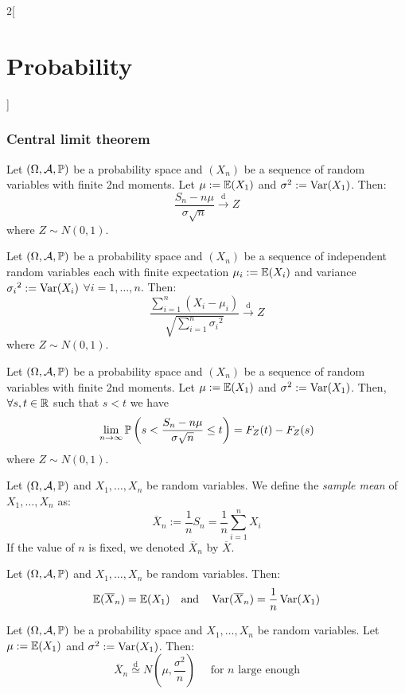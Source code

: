 \documentclass[../../../main.tex]{subfiles}
\begin{document}
\begin{multicols}{2}[\section{Probability}]
  \subsubsection{Central limit theorem}
  \begin{theorem}
    Let $(\Omega,\mathcal{A},\mathbb{P})$ be a probability space and $(X_n)$ be a sequence of \iid random variables with finite 2nd moments. Let $\mu:=\mathbb{E}(X_1)$ and $\sigma^2:=\operatorname{Var}(X_1)$. Then: $$\frac{S_n-n\mu}{\sigma\sqrt{n}}\overset{\text{d}}{\longrightarrow} Z$$
    where $Z\sim N(0,1)$.
  \end{theorem}
  \begin{theorem}
    Let $(\Omega,\mathcal{A},\mathbb{P})$ be a probability space and $(X_n)$ be a sequence of independent random variables each with finite expectation $\mu_i:=\mathbb{E}(X_i)$ and variance ${\sigma_i}^2:=\operatorname{Var}(X_i)$ $\forall i=1,\ldots,n$. Then: $$\frac{\sum_{i=1}^n(X_i-\mu_i)}{\sqrt{\sum_{i=1}^n{\sigma_i}^2}}\overset{\text{d}}{\longrightarrow} Z$$
    where $Z\sim N(0,1)$.
  \end{theorem}
  \begin{corollary}
    Let $(\Omega,\mathcal{A},\mathbb{P})$ be a probability space and $(X_n)$ be a sequence of \iid random variables with finite 2nd moments. Let $\mu:=\mathbb{E}(X_1)$ and $\sigma^2:=\operatorname{Var}(X_1)$. Then, $\forall s,t\in\mathbb{R}$ such that $s<t$ we have $$\lim_{n\to\infty}\mathbb{P}\left(s<\frac{S_n-n\mu}{\sigma\sqrt{n}}\leq t\right)=F_Z(t)-F_Z(s)$$ where $Z\sim N(0,1)$.
  \end{corollary}
  \begin{definition}
    Let $(\Omega,\mathcal{A},\mathbb{P})$ and $X_1,\ldots,X_n$ be random variables. We define the \emph{sample mean} of $X_1,\ldots,X_n$ as: $$\overline{X}_n:=\frac{1}{n}S_n=\frac{1}{n}\sum_{i=1}^nX_i$$
    If the value of $n$ is fixed, we denoted $\overline{X}_n$ by $\overline{X}$.
  \end{definition}
  \begin{proposition}
    Let $(\Omega,\mathcal{A},\mathbb{P})$ and $X_1,\ldots,X_n$ be \iid random variables. Then: $$\mathbb{E}(\overline{X}_n)=\mathbb{E}(X_1)\quad\text{and}\quad\operatorname{Var}(\overline{X}_n)=\frac{1}{n}\operatorname{Var}(X_1)$$
  \end{proposition}
  \begin{corollary}
    Let $(\Omega,\mathcal{A},\mathbb{P})$ be a probability space and $X_1,\ldots,X_n$ be \iid random variables. Let $\mu:=\mathbb{E}(X_1)$ and $\sigma^2:=\operatorname{Var}(X_1)$. Then: $$\overline{X}_n\overset{\text{d}}{\simeq }N\left(\mu,\frac{\sigma^2}{n}\right)\quad\text{ for $n$ large enough}$$

\end{corollary}
\end{multicols}
\end{document}
